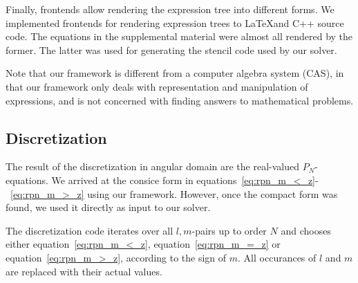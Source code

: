 \begin{figure}[h]
\centering
\begin{subfigure}{0.45\columnwidth}
\end{subfigure}%
\hspace{0.05\columnwidth}
\begin{subfigure}{0.45\columnwidth}
\end{subfigure}%

\begin{subfigure}{0.45\columnwidth}
\end{subfigure}%
\hspace{0.05\columnwidth}
\begin{subfigure}{0.45\columnwidth}
\end{subfigure}%
\vspace{-0.2in}
\end{figure}

Finally, frontends allow rendering the expression tree into different forms. We implemented frontends for rendering expression trees to \LaTeX and C++ source code. The equations in the supplemental material were almost all rendered by the former. The latter was used for generating the stencil code used by our solver.

Note that our framework is different from a computer algebra system (CAS), in that our framework only deals with representation and manipulation of expressions, and is not concerned with finding answers to mathematical problems. 

\subsection{Discretization}

The result of the discretization in angular domain are the real-valued $P_N$-equations. We arrived at the consice form in equations~\ref{eq:rpn_m_<_z}-~\ref{eq:rpn_m_>_z} using our framework. However, once the compact form was found, we used it directly as input to our solver.

The discretization code iterates over all $l,m$-pairs up to order $N$ and chooses either equation~\ref{eq:rpn_m_<_z}, equation~\ref{eq:rpn_m_=_z} or equation~\ref{eq:rpn_m_>_z}, according to the sign of $m$. All occurances of $l$ and $m$ are replaced with their actual values.

